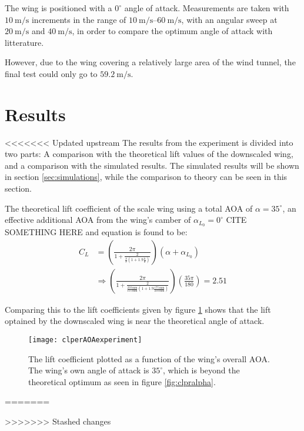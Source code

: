   The wing is positioned with a $0^\circ$ angle of attack. Measurements are taken with $\SI{10}{\metre\per\second}$ increments in the range of $\SIrange{10}{60}{\metre\per\second}$, with an angular sweep at $\SI{20}{\metre\per\second}$ and $\SI{40}{\metre\per\second}$, in order to compare the optimum angle of attack with litterature.

  However, due to the wing covering a relatively large area of the wind tunnel, the final test could only go to $\SI{59.2}{\metre\per\second}$.


\section{Results}

<<<<<<< Updated upstream
  The results from the experiment is divided into two parts: A comparison with the theoretical lift values of the downscaled wing, and a comparison with the simulated results. The simulated results will be shown in section \ref{sec:simulations}, while the comparison to theory can be seen in this section.

  The theoretical lift coefficient of the scale wing using a total AOA of $\alpha = 35^\circ$, an effective additional AOA from the wing's camber of $\alpha_{L_0} = 0^\circ$ CITE SOMETHING HERE and equation \cite{eq:CL} is found to be:
  \begin{align*}
    C_L &= \left(\frac{2\pi}{1+\frac{2}{\frac{b}{c}\left(1+1.9\frac{h}{b}\right)}}\right)\left(\alpha + \alpha_{L_0}\right)\\
    &\Rightarrow
    \left(\frac{2\pi}{1+\frac{2}{\frac{\SI{250}{\milli\metre}}{\SI{155}{\milli\metre}}\left(1+1.9\frac{\SI{175}{\milli\metre}}{\SI{250}{\milli\metre}}\right)}}\right)\left(\frac{35\pi}{180}\right) = 2.51
  \end{align*}

  Comparing this to the lift coefficients given by figure \ref{fig:clperAOAexperiment} shows that the lift optained by the downscaled wing is near the theoretical angle of attack.

  \begin{figure}
    \texttt{[image: clperAOAexperiment]}
    \caption{The lift coefficient plotted as a function of the wing's overall AOA. The wing's own angle of attack is $35^\circ$, which is beyond the theoretical optimum as seen in figure \ref{fig:clpralpha}.}
    \label{fig:clperAOAexperiment}
  \end{figure}
=======
  
>>>>>>> Stashed changes
